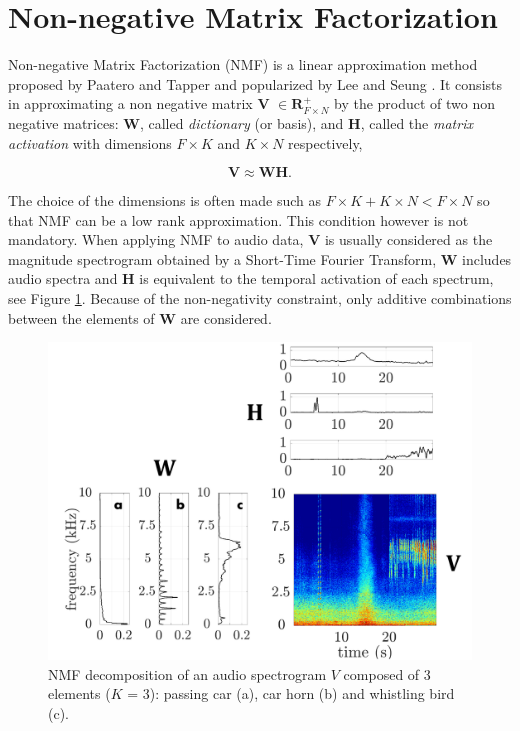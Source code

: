 \documentclass[review,5p,twocolumn,sort&compress,times]{elsarticle}
\begin{document}
\section{Non-negative Matrix Factorization}\label{part:nmf}

Non-negative Matrix Factorization (NMF) is a linear approximation method proposed by Paatero and Tapper \cite{paatero1994positive} and popularized by Lee and Seung \cite{lee_learning_1999}. It consists in approximating a non negative matrix $\mathbf{V}$ $\in \mathbf{R}^+_{F \times N}$ by the product of two non negative matrices: $\mathbf{W}$, called \textit{dictionary} (or basis), and $\mathbf{H}$, called the \textit{matrix activation} with dimensions $F \times K$ and $K \times N$ respectively, 

\begin{equation}\label{eq:nmf}
\mathbf{V} \approx \mathbf{WH}.
\end{equation}

The choice of the dimensions is often made such as $F\times K + K \times N < F \times N$ so that NMF can be a low rank approximation. This condition however is not mandatory. When  applying NMF to audio data, $\mathbf{V}$ is usually considered as the magnitude spectrogram obtained by a Short-Time Fourier Transform, $\mathbf{W}$ includes audio spectra and $\mathbf{H}$ is equivalent to the temporal activation of each spectrum, see Figure \ref{fig:exampleNMF}. Because of the non-negativity constraint, only additive combinations between the elements of $\mathbf{W}$ are considered. 

\begin{figure}[t]
\includegraphics[width=.9\linewidth]{./figures/schema_introduction_nmf.pdf}
\caption{NMF decomposition of an audio spectrogram $V$ composed of 3 elements ($K$ = 3): passing car (a), car horn (b) and whistling bird (c).}
\label{fig:exampleNMF}
\end{figure}
\end{document}
